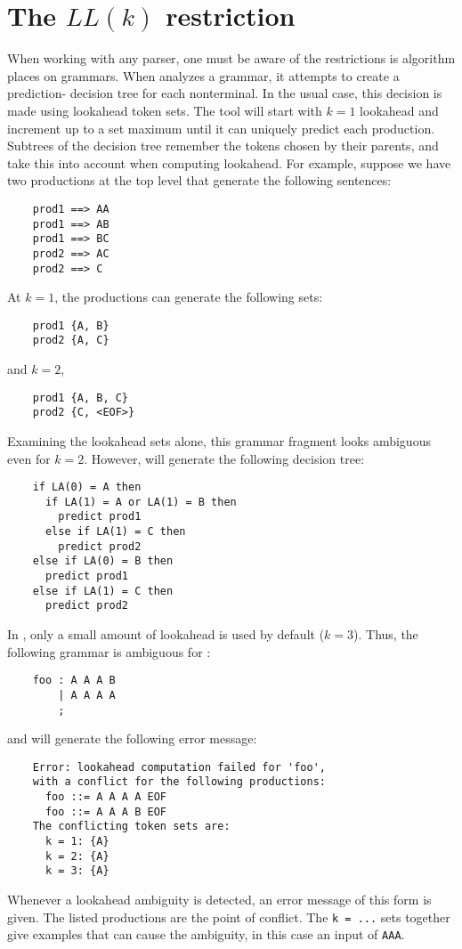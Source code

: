 \section{The $LL(k)$ restriction}\label{sec:antlr-llk}

When working with any parser, one must be aware of the restrictions is algorithm places on grammars.
When \antlr{} analyzes a grammar, it attempts to create a prediction-
decision tree for each nonterminal.  In the usual case, this decision
is made using lookahead token sets.  The tool will start with $k = 1$
lookahead and increment up to a set maximum until it can
uniquely predict each production.  Subtrees of the decision tree
remember the tokens chosen by their parents, and take this into account
when computing lookahead.  For example, suppose we have two productions
at the top level that generate the following sentences:
\begin{verbatim}
    prod1 ==> AA
    prod1 ==> AB
    prod1 ==> BC
    prod2 ==> AC
    prod2 ==> C
\end{verbatim}
At $k = 1$, the productions can generate the following sets:
\begin{verbatim}
    prod1 {A, B}
    prod2 {A, C}
\end{verbatim}
and $k = 2$,
\begin{verbatim}
    prod1 {A, B, C}
    prod2 {C, <EOF>}
\end{verbatim}
Examining the lookahead sets alone, this grammar fragment looks ambiguous
even for $k = 2$.  However, \antlr{} will generate the following decision
tree:
\begin{verbatim}
    if LA(0) = A then
      if LA(1) = A or LA(1) = B then
        predict prod1
      else if LA(1) = C then
        predict prod2
    else if LA(0) = B then
      predict prod1
    else if LA(1) = C then
      predict prod2
\end{verbatim}

In \antlr{}, only a small amount of lookahead is used by default ($k = 3$).  Thus, the following grammar is ambiguous for \antlr{}:
\begin{verbatim}
    foo : A A A B
        | A A A A
        ;
\end{verbatim}
and will generate the following error message:
\begin{verbatim}
    Error: lookahead computation failed for 'foo',
    with a conflict for the following productions:
      foo ::= A A A A EOF
      foo ::= A A A B EOF
    The conflicting token sets are:
      k = 1: {A}
      k = 2: {A}
      k = 3: {A}
\end{verbatim}
Whenever a lookahead ambiguity is detected, an error message of this form is given.  The listed productions are the point of conflict.  The {\tt k = ...} sets together give examples that can cause the ambiguity, in this case an input of {\tt AAA}.

